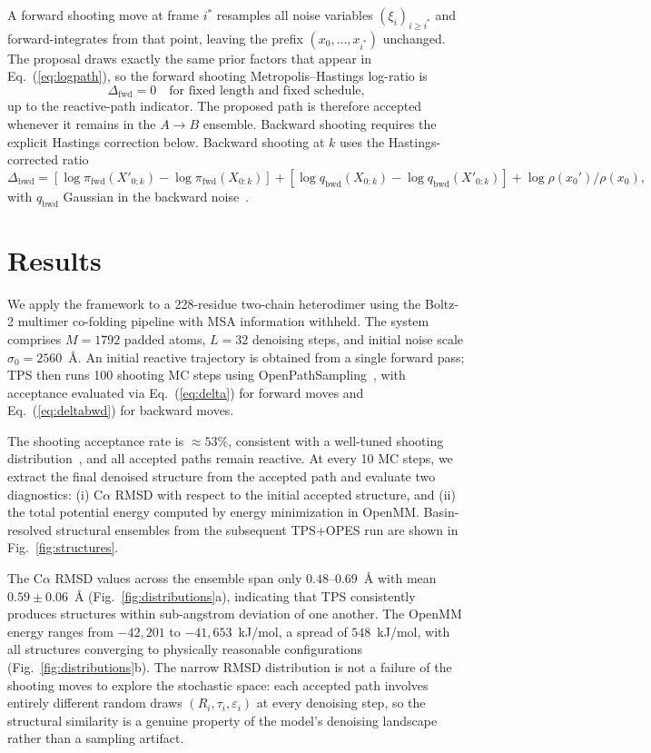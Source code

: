 \documentclass[aps,prl,twocolumn,superscriptaddress,floatfix]{revtex4-2}
\begin{document}
A forward shooting move at frame $i^*$ resamples all noise variables
$(\xi_i)_{i \geq i^*}$ and forward-integrates from that point, leaving the
prefix $(x_0, \ldots, x_{i^*})$ unchanged.  The proposal draws exactly the
same prior factors that appear in Eq.~(\ref{eq:logpath}), so the forward
shooting Metropolis--Hastings log-ratio is
%
\begin{equation}
\Delta_{\mathrm{fwd}} = 0
\quad\text{for fixed length and fixed schedule,}
\label{eq:delta}
\end{equation}
%
up to the reactive-path indicator.  The proposed path is therefore accepted
whenever it remains in the $A\to B$ ensemble.  Backward shooting requires the
explicit Hastings correction below.
Backward shooting at $k$ uses the Hastings-corrected ratio
\begin{equation}
\Delta_{\mathrm{bwd}} = [\log\pi_{\mathrm{fwd}}(X'_{0:k}) -
\log\pi_{\mathrm{fwd}}(X_{0:k})] + [\log q_{\mathrm{bwd}}(X_{0:k}) -
\log q_{\mathrm{bwd}}(X'_{0:k})] + \log\rho(x_0')/\rho(x_0),
\label{eq:deltabwd}
\end{equation}
with $q_{\mathrm{bwd}}$ Gaussian in the backward noise~\cite{falkner2024}.

\section{Results}

We apply the framework to a 228-residue two-chain heterodimer using the
Boltz-2 multimer co-folding pipeline with MSA information withheld.
The system comprises $M = 1792$ padded atoms,
$L = 32$ denoising steps, and initial noise scale $\sigma_0 = 2560$~\AA.
An initial reactive trajectory is obtained from a single forward pass; TPS
then runs 100 shooting MC steps using OpenPathSampling~\cite{ops},
with acceptance evaluated via Eq.~(\ref{eq:delta}) for forward moves and
Eq.~(\ref{eq:deltabwd}) for backward moves.

The shooting acceptance rate is $\approx 53\%$, consistent with a well-tuned
shooting distribution~\cite{bolhuis2002}, and all accepted paths remain
reactive.  At every 10 MC steps, we extract the final denoised structure from
the accepted path and evaluate two diagnostics: (i) C$\alpha$ RMSD with respect
to the initial accepted structure, and (ii) the total potential energy computed
by energy minimization in OpenMM.  Basin-resolved structural ensembles from the
subsequent TPS+OPES run are shown in Fig.~\ref{fig:structures}.

The C$\alpha$ RMSD values across the ensemble span only $0.48$--$0.69$~\AA{}
with mean $0.59 \pm 0.06$~\AA{} (Fig.~\ref{fig:distributions}a), indicating
that TPS consistently produces structures within sub-angstrom deviation of one
another.  The OpenMM energy ranges from $-42{,}201$ to $-41{,}653$~kJ/mol, a
spread of $548$~kJ/mol, with all structures converging to physically reasonable
configurations (Fig.~\ref{fig:distributions}b).  The narrow RMSD distribution
is not a failure of the shooting moves to explore the stochastic space: each
accepted path involves entirely different random draws
$(R_i, \tau_i, \varepsilon_i)$ at every denoising step, so the structural
similarity is a genuine property of the model's denoising landscape rather than
a sampling artifact.
\end{document}
